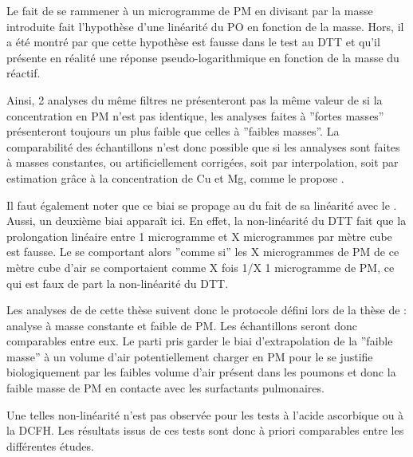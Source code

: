 Le fait de se rammener à un microgramme de PM en divisant par la masse introduite fait
l'hypothèse d'une linéarité du PO en fonction de la masse. Hors, il a été montré par
\textcite{charrierDithiothreitol2012,charrierBias2016,calasComparison2018} que cette
hypothèse est fausse dans le test au DTT et qu'il présente en réalité une réponse
pseudo-logarithmique en fonction de la masse du réactif.

Ainsi, 2 analyses du même filtres ne présenteront pas la même valeur de \PODTTm{} si la
concentration en PM n'est pas identique, les analyses faites à ''fortes masses''
présenteront toujours un \PODTTm{} plus faible que celles à ''faibles masses''.
La comparabilité des échantillons n'est donc possible que si les annalyses sont faites à
masses constantes, ou artificiellement corrigées, soit par interpolation, soit par
estimation grâce à la concentration de Cu et Mg, comme le propose
\textcite{charrierBias2016}.

Il faut également noter que ce biai se propage au \PODTTv{} du fait de sa linéarité avec le
\PODTTm. Aussi, un deuxième biai apparaît ici. En effet, la non-linéarité du DTT fait
que la prolongation linéaire entre 1 microgramme et X microgrammes par mètre cube est
fausse. Le \PODTTv{} se comportant alors ''comme si'' les X microgrammes de PM de ce mètre
cube d'air se comportaient comme X fois 1/X 1 microgramme de PM, ce qui est faux de part
la non-linéarité du DTT.

Les analyses de \PODTT{} de cette thèse suivent donc le protocole défini lors de la thèse
de \textcite{calasPollution2017} : analyse à masse constante et faible de PM. Les
échantillons seront donc comparables entre eux. Le parti pris garder le biai
d'extrapolation de la ''faible masse'' à un volume d'air potentiellement charger en PM
pour le \PODTTv{} se justifie biologiquement par les faibles volume d'air présent dans les
poumons et donc la faible masse de PM en contacte avec les surfactants pulmonaires.

Une telles non-linéarité n'est pas observée pour les tests à l'acide ascorbique ou à la
DCFH.
Les résultats issus de ces tests sont donc à priori comparables entre les différentes
études.

%


